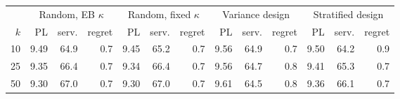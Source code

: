\begin{tabular}{rrrrrrrrrrrrr}
\toprule
& \multicolumn{3}{c}{Random, EB $\kappa$} & \multicolumn{3}{c}{Random, fixed $\kappa$} & \multicolumn{3}{c}{Variance design} & \multicolumn{3}{c}{Stratified design} \\
\cmidrule(lr){2-4}\cmidrule(lr){5-7}\cmidrule(lr){8-10}\cmidrule(lr){11-13}
$k$ & PL & serv. & regret & PL & serv. & regret & PL & serv. & regret & PL & serv. & regret \\
\midrule
10 & 9.49 & 64.9 & 0.7 & 9.45 & 65.2 & 0.7 & 9.56 & 64.9 & 0.7 & 9.50 & 64.2 & 0.9 \\
25 & 9.35 & 66.4 & 0.7 & 9.34 & 66.4 & 0.7 & 9.56 & 64.7 & 0.8 & 9.41 & 65.3 & 0.7 \\
50 & 9.30 & 67.0 & 0.7 & 9.30 & 67.0 & 0.7 & 9.61 & 64.5 & 0.8 & 9.36 & 66.1 & 0.7 \\
\bottomrule
\end{tabular}
